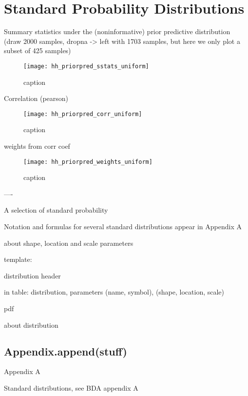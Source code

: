 \chapter{Standard Probability Distributions}\label{sec:Appendix A}


Summary statistics under the (noninformative) prior predictive distribution (draw 2000 samples, dropna -> left with 1703 samples, but here we only plot a subset of 425 samples)

\begin{figure}[H]
    \centering
    \texttt{[image: hh\_priorpred\_sstats\_uniform]}
    \caption{caption}
    \label{fig:fig1}
\end{figure} 


Correlation (pearson) 

\begin{figure}[H]
    \centering
    \texttt{[image: hh\_priorpred\_corr\_uniform]}
    \caption{caption}
    \label{fig:fig1}
\end{figure} 

weights from corr coef

\begin{figure}[H]
    \centering
    \texttt{[image: hh\_priorpred\_weights\_uniform]}
    \caption{caption}
    \label{fig:fig1}
\end{figure} 

 

----


A selection of standard probability 

Notation and formulas for several standard distributions appear in Appendix A 


about shape, location and scale parameters

template: 

distribution header

in table: 
distribution, parameters 
(name, symbol), (shape, location, scale)

pdf

about distribution


\section{Appendix.append(stuff)}

Appendix A

Standard distributions, see BDA appendix A

